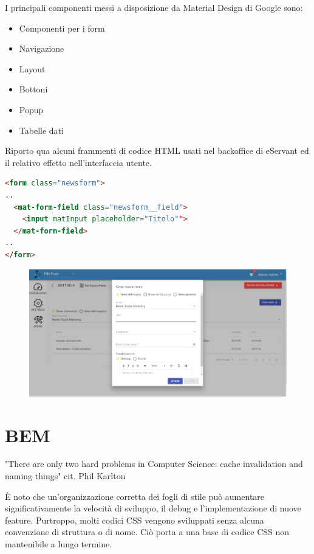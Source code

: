 I principali componenti messi a disposizione da Material Design di Google sono:

\begin{itemize}
    \item Componenti per i form
    \item Navigazione
    \item Layout
    \item Bottoni
    \item Popup
    \item Tabelle dati
\end{itemize}

Riporto qua alcuni frammenti di codice HTML usati nel backoffice di eServant ed il relativo effetto
nell'interfaccia utente.

\begin{lstlisting}[language=html]
<form class="newsform">
..
  <mat-form-field class="newsform__field">
    <input matInput placeholder="Titolo"">
  </mat-form-field>
..
</form>
\end{lstlisting}

\begin{figure}[H]
    \centering  
    \includegraphics[scale=0.4]{img/cap3/backoffice-form}
\end{figure}

\section{BEM}
"There are only two hard problems in Computer Science: cache invalidation and naming things" cit. Phil Karlton

È noto che un'organizzazione corretta dei fogli di stile può aumentare significativamente la velocità
di sviluppo, il debug e l'implementazione di nuove feature. Purtroppo, molti codici CSS vengono
sviluppati senza alcuna convenzione di struttura o di nome. Ciò porta a una base di codice CSS 
non mantenibile a lungo termine.

